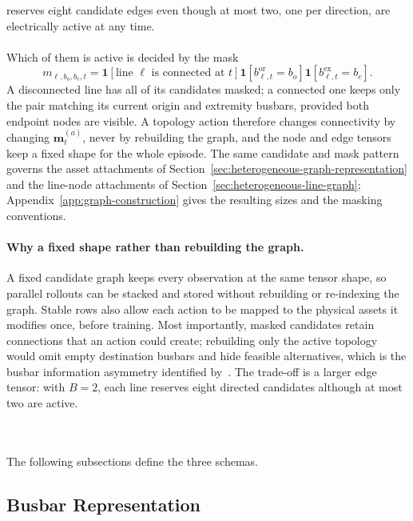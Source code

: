 reserves eight candidate edges even though at most two, one per direction, are
electrically active at any time.
\\
\\
Which of them is active is decided by the mask
\begin{equation}
  m_{\ell,b_o,b_e,t}=
  \mathbf{1}\!\left[\text{line }\ell\text{ is connected at }t\right]
  \mathbf{1}\!\left[b^{\mathrm{or}}_{\ell,t}=b_o\right]
  \mathbf{1}\!\left[b^{\mathrm{ex}}_{\ell,t}=b_e\right].
  \label{eq:physical-edge-mask}
\end{equation}
A disconnected line has all of its candidates masked; a connected one keeps
only the pair matching its current origin and extremity busbars, provided both
endpoint nodes are visible. A topology action therefore changes connectivity
by changing $\mathbf{m}^{(a)}_t$, never by rebuilding the graph, and the node
and edge tensors keep a fixed shape for the whole episode. The same candidate
and mask pattern governs the asset attachments of
Section~\ref{sec:heterogeneous-graph-representation} and the line-node
attachments of Section~\ref{sec:heterogeneous-line-graph};
Appendix~\ref{app:graph-construction} gives the resulting sizes and the
masking conventions.

{\color{clarif}
\paragraph{Why a fixed shape rather than rebuilding the graph.}
A fixed candidate graph keeps every observation at the same tensor shape, so
parallel rollouts can be stacked and stored without rebuilding or re-indexing
the graph. Stable rows also allow each action to be mapped to the physical
assets it modifies once, before training. Most importantly, masked candidates
retain connections that an action could create; rebuilding only the active
topology would omit empty destination busbars and hide feasible alternatives,
which is the busbar information asymmetry identified
by~\textcite{dejong2025gnntopo}. The trade-off is a larger edge tensor: with
$B=2$, each line reserves eight directed candidates although at most two are
active.
}
\\
\\
The following subsections define the three schemas.

\subsection{Busbar Representation}
\label{subsec:busbar-representation}


